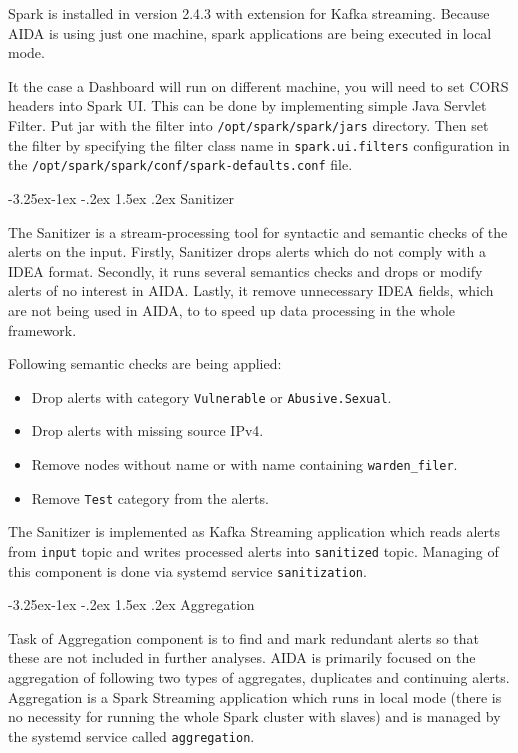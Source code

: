 \documentclass[a4paper]{article} %
\makeatletter
\renewcommand\subsection{\@startsection{subsection}{2}{\z@}%
                   {-3.25ex\@plus -1ex \@minus -.2ex}%
                   {1.5ex \@plus .2ex}%
                   {\normalfont\sffamily\large\bfseries\color{projectcolor}}}
\makeatother
\begin{document}
Spark is installed in version 2.4.3 with extension for Kafka streaming. Because AIDA is using just one machine, spark applications are being executed in local mode.

It the case a Dashboard will run on different machine, you will need to set CORS headers into Spark UI. This can be done by implementing simple Java Servlet Filter. Put jar with the filter into \texttt{/opt/spark/spark/jars} directory. Then set the filter by specifying the filter class name in \texttt{spark.ui.filters} configuration in the \texttt{/opt/spark/spark/conf/spark-defaults.conf} file.

\subsection{Sanitizer}

The Sanitizer is a stream-processing tool for syntactic and semantic checks of the alerts on the input. Firstly, Sanitizer drops alerts which do not comply with a IDEA format. Secondly, it runs several semantics checks and drops or modify alerts of no interest in AIDA. Lastly, it remove unnecessary IDEA fields, which are not being used in AIDA, to to speed up data processing in the whole framework.

Following semantic checks are being applied:
\begin{itemize}[noitemsep,nolistsep]
\item Drop alerts with category \texttt{Vulnerable} or \texttt{Abusive.Sexual}.
\item Drop alerts with missing source IPv4.
\item Remove nodes without name or with name containing \texttt{warden\_filer}.
\item Remove \texttt{Test} category from the alerts.
\end{itemize}
The Sanitizer is implemented as Kafka Streaming application which reads alerts from \texttt{input} topic and writes processed alerts into \texttt{sanitized} topic. Managing of this component is done via systemd service \texttt{sanitization}.

\subsection{Aggregation}

Task of Aggregation component is to find and mark redundant alerts so that these are not
included in further analyses. AIDA is primarily focused on the aggregation of following two types of aggregates,
duplicates and continuing alerts.
Aggregation is a Spark Streaming application which runs in local mode (there is no necessity for running the whole
Spark cluster with slaves) and is managed by the systemd service called \texttt{aggregation}.
\end{document}
